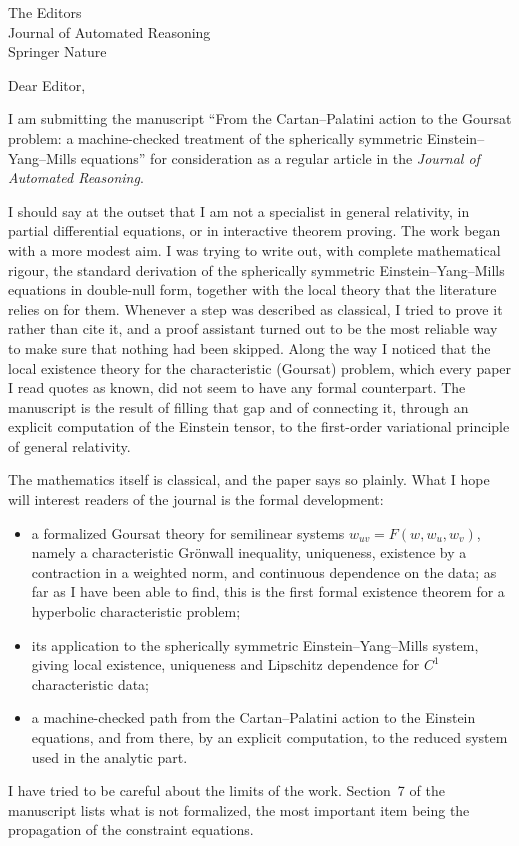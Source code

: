 \documentclass[11pt]{letter}
\begin{document}
\begin{letter}{The Editors\\Journal of Automated Reasoning\\Springer Nature}

\opening{Dear Editor,}

I am submitting the manuscript ``From the Cartan--Palatini action to the Goursat problem: a machine-checked treatment of the spherically symmetric Einstein--Yang--Mills equations'' for consideration as a regular article in the \emph{Journal of Automated Reasoning}.

I should say at the outset that I am not a specialist in general relativity, in partial differential equations, or in interactive theorem proving. The work began with a more modest aim. I was trying to write out, with complete mathematical rigour, the standard derivation of the spherically symmetric Einstein--Yang--Mills equations in double-null form, together with the local theory that the literature relies on for them. Whenever a step was described as classical, I tried to prove it rather than cite it, and a proof assistant turned out to be the most reliable way to make sure that nothing had been skipped. Along the way I noticed that the local existence theory for the characteristic (Goursat) problem, which every paper I read quotes as known, did not seem to have any formal counterpart. The manuscript is the result of filling that gap and of connecting it, through an explicit computation of the Einstein tensor, to the first-order variational principle of general relativity.

The mathematics itself is classical, and the paper says so plainly. What I hope will interest readers of the journal is the formal development:
\begin{itemize}[leftmargin=1.5em,itemsep=2pt]
\item a formalized Goursat theory for semilinear systems $w_{uv}=F(w,w_u,w_v)$, namely a characteristic Gr\"onwall inequality, uniqueness, existence by a contraction in a weighted norm, and continuous dependence on the data; as far as I have been able to find, this is the first formal existence theorem for a hyperbolic characteristic problem;
\item its application to the spherically symmetric Einstein--Yang--Mills system, giving local existence, uniqueness and Lipschitz dependence for $C^1$ characteristic data;
\item a machine-checked path from the Cartan--Palatini action to the Einstein equations, and from there, by an explicit computation, to the reduced system used in the analytic part.
\end{itemize}
I have tried to be careful about the limits of the work. Section~7 of the manuscript lists what is not formalized, the most important item being the propagation of the constraint equations.


\end{letter}
\end{document}
